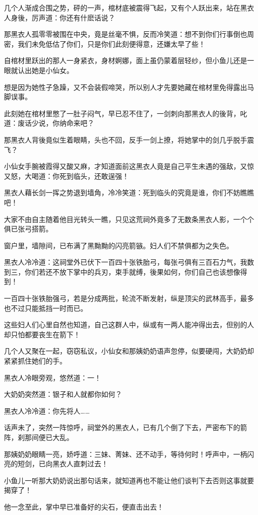 \documentclass[12pt,oneside]{book}
\begin{document}
几个人渐成合围之势，砰的一声，棺材底被震得飞起，又有个人跃出来，站在黑衣人身後，厉声道：你还有什麽话说？

那黑衣人孤零零被围在中央，竟是丝毫不惧，反而冷笑道：想不到你们行事倒也周密，我们未免低估了你们，只是你们此刻便得意，还嫌太早了些！

自棺材里跃出的那人一身紧衣，身材婀娜，面上虽仍蒙着层轻纱，但小鱼儿还是一眼就认出她是小仙女。

想是因为她性子急躁，又不会装假啼哭，所以别人才先要她藏在棺材里免得露出马脚误事。

此刻她在棺材里憋了一肚子闷气，早已忍不住了，一剑刺向那黑衣人的後背，叱道：废话少说，你纳命来吧？

那黑衣人背後竟似生着眼睛，头也不回，反手一剑上撩，将她掌中的剑几乎脱手震飞？

小仙女手腕被霞得又酸又麻，才知道面前这黑衣人竟是自己平生未遇的强敌，又惊又怒，大喝道：你死到临头，还敢逞强！

黑衣人藉长剑一挥之势退到墙角，冷冷笑道：死到临头的究竟是谁，你们不妨瞧瞧吧！

大家不由自主随着他目光转头一瞧，只见这荒祠外竟多了无数条黑衣人影，一个个俱已张弓搭箭。

窗户里，墙隙间，已布满了黑黝黝的闪亮箭镞。妇人们不禁俱都为之失色。

黑衣人冷冷道：这祠堂外已伏下一百四十张铁胎弓，每张弓俱有三百石力气，我数到三，你们若还不放下掌中的兵刃，束手就缚，後果如何，你们自己也该想像得到！

一百四十张铁胎强弓，若是分成两批，轮流不断发射，纵是顶尖的武林高手，最多也不过只能抵挡一时而已。

这些妇人们心里自然也知道，自己这群人中，纵或有一两人能冲得出去，但别的人却只怕都要丧生在箭下！

几个人又聚在一起，窃窃私议，小仙女和那姨奶奶语声忽停，似要硬闯，大奶奶却紧紧抓住她们的手。

黑衣人冷眼旁观，悠然道：一！

大奶奶突然道：银子和人就都你如何？

黑衣人冷冷道：你先将人\ldots\ldots{}

话声未了，突然一阵惊呼，祠堂外的黑衣人，已有几个倒了下去，严密布下的箭阵，刹那间便已大乱。

那姨奶奶眼睛一亮，娇呼道：三妹、菁妹、还不动手，等待何时！呼声中，一柄闪亮的短剑，已向黑衣人直刺过去！

小鱼儿一听那大奶奶说出那句话来，就知道再也不能让他们谈判下去否则这事就要揭穿了！

他一念至此，掌中早已准备好的尖石，便直击出去！
\end{document}

